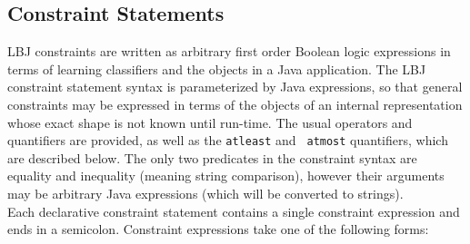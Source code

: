 \subsection{Constraint Statements} \label{subsection:constraintStatements}

LBJ constraints are written as arbitrary first order Boolean logic expressions
in terms of learning classifiers and the objects in a Java application.  The
LBJ constraint statement syntax is parameterized by Java expressions, so that
general constraints may be expressed in terms of the objects of an internal
representation whose exact shape is not known until run-time.  The usual
operators and quantifiers are provided, as well as the {\tt atleast} and {\tt
atmost} quantifiers, which are described below.  The only two predicates in
the constraint syntax are equality and inequality (meaning string comparison),
however their arguments may be arbitrary Java expressions (which will be
converted to strings). \\

Each declarative constraint statement contains a single constraint expression
and ends in a semicolon.  Constraint expressions take one of the following
forms:

